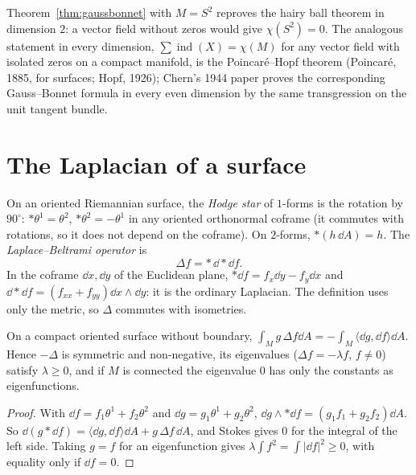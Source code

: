 \begin{remark}
Theorem~\ref{thm:gaussbonnet} with $M=S^2$ reproves the hairy ball theorem in dimension $2$: a vector field without zeros would give $\chi(S^2)=0$. The analogous
statement in every dimension, $\sum\operatorname{ind}(X)=\chi(M)$ for any vector field with isolated zeros on a compact manifold, is the Poincar\'e--Hopf theorem (Poincar\'e,
1885, for surfaces; Hopf, 1926); Chern's 1944 paper proves the corresponding Gauss--Bonnet formula in every even dimension by the same transgression on the unit
tangent bundle.
\end{remark}

\section{The Laplacian of a surface}

On an oriented Riemannian surface, the \emph{Hodge star} of $1$-forms is the rotation by $90^\circ$: $\ast\theta^1=\theta^2$, $\ast\theta^2=-\theta^1$ in any oriented orthonormal coframe (it
commutes with rotations, so it does not depend on the coframe). On $2$-forms, $\ast(h\,\dd A)=h$. The \emph{Laplace--Beltrami operator} is
\[
\Delta f=\ast\,\dd\ast\dd f.
\]
In the coframe $\dd x,\dd y$ of the Euclidean plane, $\ast\dd f=f_x\dd y-f_y\dd x$ and $\dd\ast\dd f=(f_{xx}+f_{yy})\dd x\wedge\dd y$: it is the ordinary Laplacian. The definition uses only
the metric, so $\Delta$ commutes with isometries.

\begin{proposition}\label{prop:green}
On a compact oriented surface without boundary, $\int_Mg\,\Delta f\dd A=-\int_M\langle\dd g,\dd f\rangle\dd A$. Hence $-\Delta$ is symmetric and non-negative, its eigenvalues
($\Delta f=-\lambda f$, $f\ne0$) satisfy $\lambda\ge0$, and if $M$ is connected the eigenvalue $0$ has only the constants as eigenfunctions.
\end{proposition}
\begin{proof}
With $\dd f=f_1\theta^1+f_2\theta^2$ and $\dd g=g_1\theta^1+g_2\theta^2$, $\dd g\wedge\ast\dd f=(g_1f_1+g_2f_2)\dd A$. So $\dd(g\ast\dd f)=\langle\dd g,\dd f\rangle\dd A+g\,\Delta f\,\dd A$, and Stokes gives $0$ for the
integral of the left side. Taking $g=f$ for an eigenfunction gives $\lambda\int f^2=\int|\dd f|^2\ge0$, with equality only if $\dd f=0$.
\end{proof}

